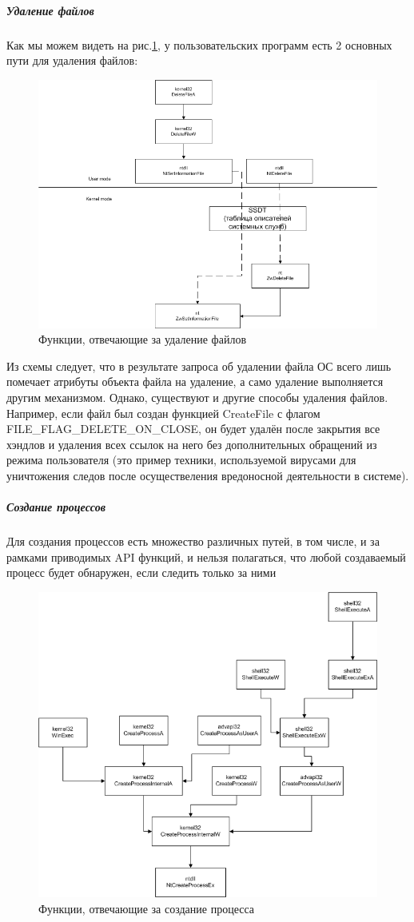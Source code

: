 \subparagraph {Удаление файлов}
Как мы можем видеть на рис.\ref{fig:filedelete}, у пользовательских программ есть 2 основных пути
для удаления файлов:
\begin {figure}[h]
	\centering
	\includegraphics[width=\linewidth]{img/DeleteFileAPIs.png}
	\caption{Функции, отвечающие за удаление файлов}
	\label{fig:filedelete}
\end {figure}
Из схемы следует, что в результате запроса об удалении файла ОС всего лишь помечает атрибуты объекта файла на удаление, а само удаление выполняется другим механизмом. Однако, существуют и другие способы удаления файлов. Например, если файл был создан функцией CreateFile с флагом FILE_FLAG_DELETE_ON_CLOSE, он будет удалён после закрытия все хэндлов и удаления всех ссылок на него без дополнительных обращений из режима пользователя (это пример техники, используемой вирусами для уничтожения следов после осуществеления вредоносной деятельности в системе).
\subparagraph {Создание процессов}
Для создания процессов есть множество различных путей, в том числе, и за рамками приводимых API функций, и нельзя полагаться, что любой создаваемый процесс будет обнаружен, если следить только за ними
\begin {figure}[h]
	\centering
	\includegraphics[width=\linewidth]{img/ExampleProcessCreateAPIs.png}
	\caption{Функции, отвечающие за создание процесса}
	\label{fig:createprocess}
\end {figure}
